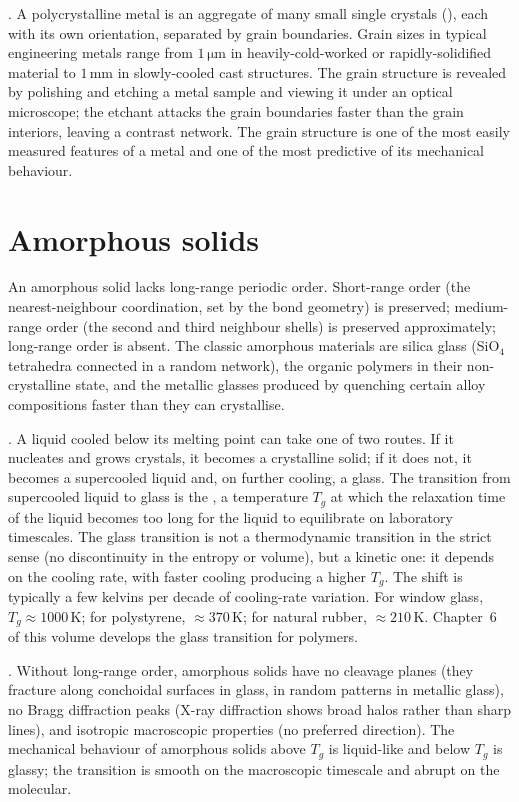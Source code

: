 . A polycrystalline metal is an aggregate of many
small single crystals (), each with its own
orientation, separated by grain boundaries. Grain sizes in typical
engineering metals range from $1\,\si{\micro\meter}$ in
heavily-cold-worked or rapidly-solidified material to $1\,
\text{mm}$ in slowly-cooled cast structures. The grain structure is
revealed by polishing and etching a metal sample and viewing it under
an optical microscope; the etchant attacks the grain boundaries faster
than the grain interiors, leaving a contrast network. The grain
structure is one of the most easily measured features of a metal and
one of the most predictive of its mechanical behaviour.

\section{Amorphous solids}

An amorphous solid lacks long-range periodic order. Short-range order
(the nearest-neighbour coordination, set by the bond geometry) is
preserved; medium-range order (the second and third neighbour shells)
is preserved approximately; long-range order is absent. The classic
amorphous materials are silica glass (SiO$_4$ tetrahedra connected in
a random network), the organic polymers in their non-crystalline
state, and the metallic glasses produced by quenching certain alloy
compositions faster than they can crystallise.

. A liquid cooled below its melting point can
take one of two routes. If it nucleates and grows crystals, it becomes
a crystalline solid; if it does not, it becomes a supercooled liquid
and, on further cooling, a glass. The transition from supercooled
liquid to glass is the , a temperature
$T_g$ at which the relaxation time of the liquid becomes too long for
the liquid to equilibrate on laboratory timescales. The glass
transition is not a thermodynamic transition in the strict sense (no
discontinuity in the entropy or volume), but a kinetic one: it
depends on the cooling rate, with faster cooling producing a higher
$T_g$. The shift is typically a few kelvins per decade of cooling-rate
variation. For window glass, $T_g \approx 1000\,\si{\kelvin}$; for
polystyrene, $\approx 370\,\si{\kelvin}$; for natural rubber, $\approx
210\,\si{\kelvin}$. Chapter~6 of this volume develops the glass
transition for polymers.

. Without long-range order,
amorphous solids have no cleavage planes (they fracture along
conchoidal surfaces in glass, in random patterns in metallic glass),
no Bragg diffraction peaks (X-ray diffraction shows broad halos
rather than sharp lines), and isotropic macroscopic properties (no
preferred direction). The mechanical behaviour of amorphous solids
above $T_g$ is liquid-like and below $T_g$ is glassy; the transition
is smooth on the macroscopic timescale and abrupt on the molecular.

